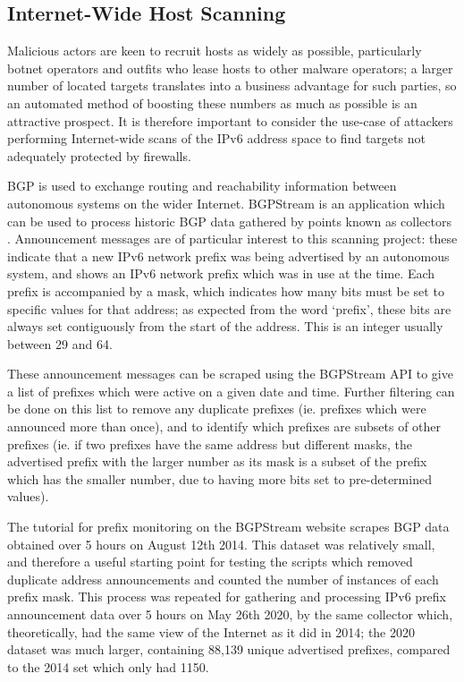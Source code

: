 \documentclass[10pt,sigconf]{acmart}
\begin{document}
\subsection{Internet-Wide Host Scanning}
Malicious actors are keen to recruit hosts as widely as possible, particularly botnet operators and outfits who lease hosts to other malware operators;
a larger number of located targets translates into a business advantage for such parties, so an automated method of boosting these numbers as much as possible is an attractive prospect.
It is therefore important to consider the use-case of attackers performing Internet-wide scans of the IPv6 address space to find targets not adequately protected by firewalls.

BGP is used to exchange routing and reachability information between autonomous systems on the wider Internet.
BGPStream is an application which can be used to process historic BGP data gathered by points known as collectors \cite{bgpstream}.
Announcement messages are of particular interest to this scanning project:
these indicate that a new IPv6 network prefix was being advertised by an autonomous system, and shows an IPv6 network prefix which was in use at the time.
Each prefix is accompanied by a mask, which indicates how many bits must be set to specific values for that address;
as expected from the word `prefix', these bits are always set contiguously from the start of the address.
This is an integer usually between 29 and 64.

These announcement messages can be scraped using the BGPStream API to give a list of prefixes which were active on a given date and time.
Further filtering can be done on this list to remove any duplicate prefixes (ie. prefixes which were announced more than once), and to identify which prefixes are subsets of other prefixes
(ie. if two prefixes have the same address but different masks, the advertised prefix with the larger number as its mask is a subset of the prefix which has the smaller number, due to having more bits set to pre-determined values).

The tutorial for prefix monitoring on the BGPStream website \cite{bgpstream-tutorial} scrapes BGP data obtained over 5 hours on August 12th 2014.
This dataset was relatively small, and therefore a useful starting point for testing the scripts which removed duplicate address announcements and counted the number of instances of each prefix mask.
This process was repeated for gathering and processing IPv6 prefix announcement data over 5 hours on May 26th 2020, by the same collector which, theoretically, had the same view of the Internet as it did in 2014;
the 2020 dataset was much larger, containing 88,139 unique advertised prefixes, compared to the 2014 set which only had 1150.
\end{document}
